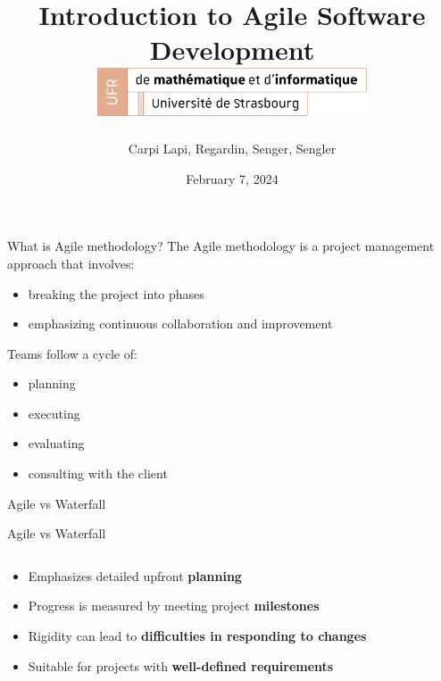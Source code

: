 \documentclass[10pt]{beamer}
\title[Introduction to Agile Software Development]{
  Introduction to Agile Software Development \\
  \vspace{1cm}
    \includegraphics[width=0.6\textwidth]{images/logo_Uni.png}}
\author[SuperAgile]{Carpi Lapi, Regardin, Senger, Sengler}
\date[February 7, 2024]{February 7, 2024}
\begin{document}
\frame{\titlepage}

\begin{frame}{What is Agile methodology?}
The Agile methodology is a project management approach that involves:
\begin{itemize}
    \item<2-> breaking the project into phases
    \item<3-> emphasizing continuous collaboration and improvement \\
    \vspace{1cm}
\end{itemize}

Teams follow a cycle of: 
\begin{itemize}
    \item<4-> planning
    \item<5-> executing
    \item<6-> evaluating
    \item<7-> consulting with the client
\end{itemize}

\end{frame}

\begin{frame}{Agile vs Waterfall}
  \vspace{0.5cm}
\end{frame}

\begin{frame}{Agile vs Waterfall}
  \vspace{0.5cm}
  \begin{columns}[T]

    \begin{column}{0.5\textwidth}
      \vspace{2cm}
      \begin{itemize}
        \item<2-> Emphasizes detailed upfront \textbf{planning}
        \item<3-> Progress is measured by meeting project \textbf{milestones}
        \item<4-> Rigidity can lead to \textbf{difficulties in responding to changes}
        \item<5-> Suitable for projects with \textbf{well-defined requirements}
      \end{itemize}
    \end{column}

    \begin{column}{0.5\textwidth}
    \end{column}

  \end{columns}
\end{frame}
\end{document}
